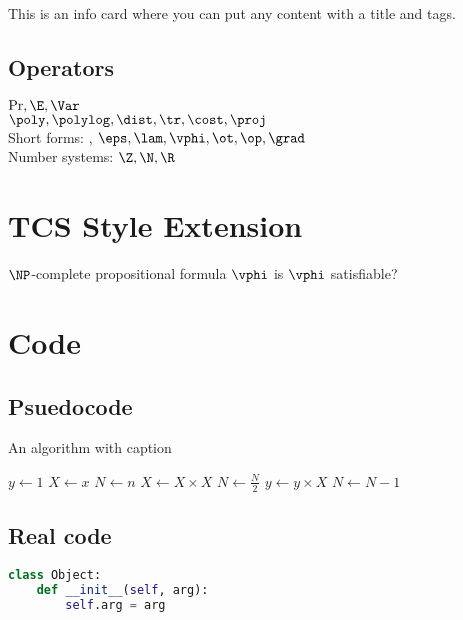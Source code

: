 {This is an info card where you can put any content with a title and tags.
}

\subsection{Operators}
$\Pr, \E, \Var$ \\
$\poly, \polylog, \dist, \tr, \cost, \proj$ \\
Short forms: \TT, \FF $\eps, \lam, \vphi, \ot, \op, \grad$ \\
Number systems: $\Z, \N, \R$

\newpage
\section{TCS Style Extension}
{$\NP$-complete}
{propositional formula $\vphi$}
{is $\vphi$ satisfiable?}

\newpage
\section{Code}
\subsection{Psuedocode}
\begin{algorithm}
\caption{An algorithm with caption}\label{alg:cap}
\begin{algorithmic}[1]
\State $y \gets 1$
\State $X \gets x$
\State $N \gets n$
        \State $X \gets X \times X$
        \State $N \gets \frac{N}{2}$  
        \State $y \gets y \times X$
        \State $N \gets N - 1$
    \EndIf
\EndWhile
\end{algorithmic}
\end{algorithm}

\subsection{Real code}
\begin{lstlisting}[language=Python]
class Object:
    def __init__(self, arg):
        self.arg = arg
\end{lstlisting}

\label{mylastpagelabel}